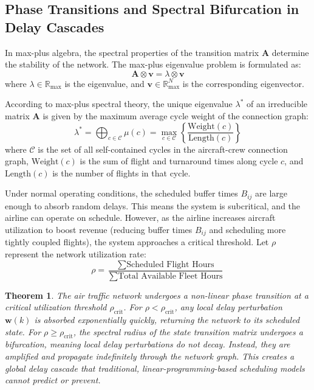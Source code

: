 \documentclass[11pt,a4paper]{book}
\newtheorem{theorem}{Theorem}
\begin{document}
\subsection{Phase Transitions and Spectral Bifurcation in Delay Cascades}

In max-plus algebra, the spectral properties of the transition matrix $\mathbf{A}$ determine the stability of the network. The max-plus eigenvalue problem is formulated as:
\begin{equation}
\mathbf{A} \otimes \mathbf{v} = \lambda \otimes \mathbf{v}
\end{equation}
where $\lambda \in \mathbb{R}_{\max}$ is the eigenvalue, and $\mathbf{v} \in \mathbb{R}_{\max}^N$ is the corresponding eigenvector.

According to max-plus spectral theory, the unique eigenvalue $\lambda^*$ of an irreducible matrix $\mathbf{A}$ is given by the maximum average cycle weight of the connection graph:
\begin{equation}
\lambda^* = \bigoplus_{c \in \mathcal{C}} \mu(c) = \max_{c \in \mathcal{C}} \left\{ \frac{\text{Weight}(c)}{\text{Length}(c)} \right\}
\end{equation}
where $\mathcal{C}$ is the set of all self-contained cycles in the aircraft-crew connection graph, $\text{Weight}(c)$ is the sum of flight and turnaround times along cycle $c$, and $\text{Length}(c)$ is the number of flights in that cycle.

Under normal operating conditions, the scheduled buffer times $B_{ij}$ are large enough to absorb random delays. This means the system is subcritical, and the airline can operate on schedule.
However, as the airline increases aircraft utilization to boost revenue (reducing buffer times $B_{ij}$ and scheduling more tightly coupled flights), the system approaches a critical threshold. Let $\rho$ represent the network utilization rate:
\begin{equation}
\rho = \frac{\sum \text{Scheduled Flight Hours}}{\sum \text{Total Available Fleet Hours}}
\end{equation}

\begin{theorem}
The air traffic network undergoes a non-linear phase transition at a critical utilization threshold $\rho_{\text{crit}}$. For $\rho < \rho_{\text{crit}}$, any local delay perturbation $\mathbf{w}(k)$ is absorbed exponentially quickly, returning the network to its scheduled state.
For $\rho \geq \rho_{\text{crit}}$, the spectral radius of the state transition matrix undergoes a bifurcation, meaning local delay perturbations do not decay. Instead, they are amplified and propagate indefinitely through the network graph. This creates a global delay cascade that traditional, linear-programming-based scheduling models cannot predict or prevent.
\end{theorem}
\end{document}
